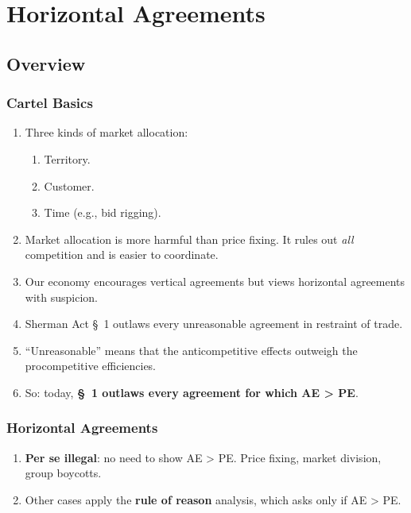 \section{Horizontal Agreements}

\subsection{Overview}

\subsubsection{Cartel Basics}

\begin{enumerate}
    \item Three kinds of market allocation:
    \begin{enumerate}
        \item Territory.
        \item Customer.
        \item Time (e.g., bid rigging).
    \end{enumerate}
    \item Market allocation is more harmful than price fixing. It rules out 
    \emph{all} competition and is easier to coordinate.
    \item Our economy encourages vertical agreements but views horizontal 
    agreements with suspicion.
    \item Sherman Act \S\ 1 outlaws every unreasonable agreement in restraint of 
    trade.
    \item ``Unreasonable'' means that the anticompetitive effects outweigh the 
    procompetitive efficiencies.
    \item So: today, \textbf{\S\ 1 outlaws every agreement for which AE > PE}.
\end{enumerate}

\subsubsection{Horizontal Agreements}

\begin{enumerate}
    \item \textbf{Per se illegal}: no need to show AE > PE. Price fixing, market 
    division, group boycotts.
    \item Other cases apply the \textbf{rule of reason} analysis, which asks 
    only if AE > PE.
\end{enumerate}

